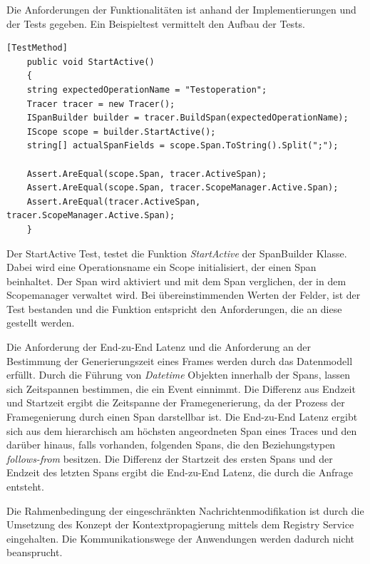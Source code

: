 Die Anforderungen der Funktionalitäten ist anhand der Implementierungen und der Tests gegeben. Ein Beispieltest vermittelt den Aufbau der Tests.

\begin{minipage}[]{\textwidth}
	\begin{lstlisting}[frame=trBL]
	[TestMethod]
	public void StartActive()
	{
	string expectedOperationName = "Testoperation";
	Tracer tracer = new Tracer();
	ISpanBuilder builder = tracer.BuildSpan(expectedOperationName);
	IScope scope = builder.StartActive();
	string[] actualSpanFields = scope.Span.ToString().Split(";");
	
	Assert.AreEqual(scope.Span, tracer.ActiveSpan);
	Assert.AreEqual(scope.Span, tracer.ScopeManager.Active.Span);
	Assert.AreEqual(tracer.ActiveSpan, tracer.ScopeManager.Active.Span);
	}
	\end{lstlisting}
	\label{listing:Unit-Test der Spanbuilder Klasse}
\end{minipage}

Der StartActive Test, testet die Funktion \emph{StartActive} der SpanBuilder Klasse. Dabei wird eine Operationsname ein Scope initialisiert, der einen Span beinhaltet. Der Span wird aktiviert und mit dem Span verglichen, der in dem Scopemanager verwaltet wird. Bei übereinstimmenden Werten der Felder, ist der Test bestanden und die Funktion entspricht den Anforderungen, die an diese gestellt werden.

Die Anforderung der End-zu-End Latenz und die Anforderung an der Bestimmung der Generierungszeit eines Frames werden durch das Datenmodell erfüllt. Durch die Führung von \emph{Datetime} Objekten innerhalb der Spans, lassen sich Zeitspannen bestimmen, die ein Event einnimmt. Die Differenz aus Endzeit und Startzeit ergibt die Zeitspanne der Framegenerierung, da der Prozess der Framegenierung durch einen Span darstellbar ist. Die End-zu-End Latenz ergibt sich aus dem hierarchisch am höchsten angeordneten Span eines Traces und den darüber hinaus, falls vorhanden, folgenden Spans, die den Beziehungstypen \emph{follows-from} besitzen. Die Differenz der Startzeit des ersten Spans und der Endzeit des letzten Spans ergibt die End-zu-End Latenz, die durch die Anfrage entsteht.

Die Rahmenbedingung der eingeschränkten Nachrichtenmodifikation ist durch die Umsetzung des Konzept der Kontextpropagierung mittels dem Registry Service eingehalten. Die Kommunikationswege der Anwendungen werden dadurch nicht beansprucht.


